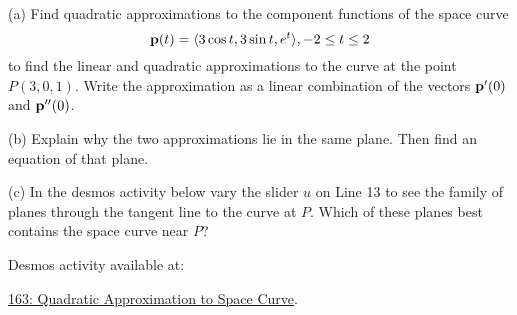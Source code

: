 \documentclass{ximera}
\begin{document}
\begin{question}  \label{Qgtyhtsry}
(a) Find quadratic approximations to the component functions of the space curve
\[
   {\bf p}(t) = \langle  3 \cos t, 3\sin t, e^t \rangle , -2\leq t \leq 2
\]
to find the linear and quadratic approximations to the curve at the point $P(3,0,1)$. Write the approximation as a linear combination of the vectors ${\bf p}^\prime(0)$ and ${\bf p}^{\prime\prime}(0)$.

(b) Explain why the two approximations lie in the same plane. Then find an equation of that plane.

(c) In the desmos activity below vary the slider $u$ on Line 13 to see the family of planes through the tangent line to the curve at $P$. Which of these planes best contains the space curve near $P$?

Desmos activity available at:

\href{https://www.desmos.com/3d/a263cd2883}{163: Quadratic Approximation to Space Curve}.

 

\end{question}
\end{document}
